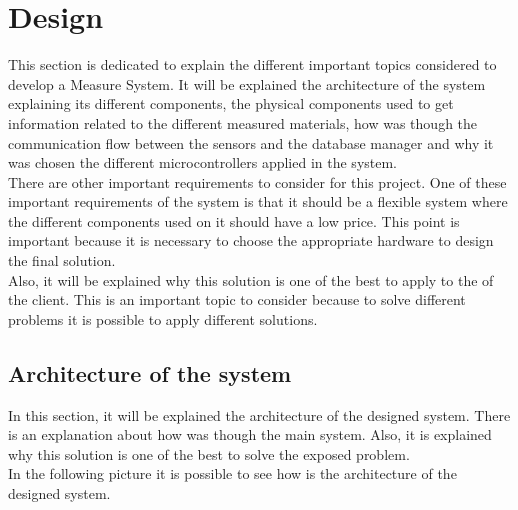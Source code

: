 
\chapter{Design}

This section is dedicated to explain the different important topics considered to develop a Measure System. It will be explained the architecture of the system explaining its different components, the physical components used to get information related to the different measured materials, how was though the communication flow between the sensors and the database manager and why it was chosen the different microcontrollers applied in the system.\\

There are other important requirements to consider for this project. One of these important requirements of the system is that it should be a flexible system where the different components used on it should have a low price. This point is important because it is necessary to choose the appropriate hardware to design the final solution.\\

Also, it will be explained why this solution is one of the best to apply to the of the client. This is an important topic to consider because to solve different problems it is possible to apply different solutions.

\section{Architecture of the system}

In this section, it will be explained the architecture of the designed system. There is an explanation about how was though the main system. Also, it is explained why this solution is one of the best to solve the exposed problem.\\

In the following picture it is possible to see how is the architecture of the designed system.\\

